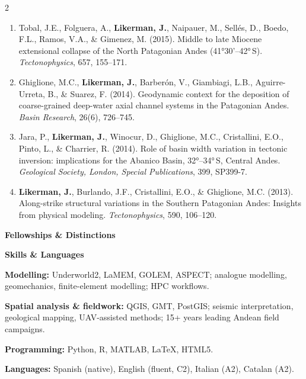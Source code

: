 \documentclass[10pt,a4paper]{../awesome-cv}
\makeatletter
\renewcommand*{\sectionstyle}[1]{{\fontsize{12.5pt}{15pt}\bodyfont\bfseries\color{text}\@sectioncolor #1}}
\renewcommand*{\descriptionstyle}[1]{{\fontsize{8.8pt}{11.2pt}\bodyfontlight\upshape\color{text} #1}}
\renewcommand{\cvsection}[1]{%
  \par\vspace{3mm}%
  \sectionstyle{#1}%
  \phantomsection%
  \color{gray}\vhrulefill{0.9pt}%
  \par\nobreak\vspace{1.8mm}%
}
\makeatother
\begin{document}
{\begin{multicols}{2}
\begin{enumerate}
  \item Tobal, J.E., Folguera, A., \textbf{Likerman, J.}, Naipauer, M., Sellés, D., Boedo, F.L., Ramos, V.A., \& Gimenez, M. (2015). Middle to late Miocene extensional collapse of the North Patagonian Andes (41°30'--42°\,S). \emph{Tectonophysics}, 657, 155--171.
  \item Ghiglione, M.C., \textbf{Likerman, J.}, Barberón, V., Giambiagi, L.B., Aguirre-Urreta, B., \& Suarez, F. (2014). Geodynamic context for the deposition of coarse-grained deep-water axial channel systems in the Patagonian Andes. \emph{Basin Research}, 26(6), 726--745.
  \item Jara, P., \textbf{Likerman, J.}, Winocur, D., Ghiglione, M.C., Cristallini, E.O., Pinto, L., \& Charrier, R. (2014). Role of basin width variation in tectonic inversion: implications for the Abanico Basin, 32°--34°\,S, Central Andes. \emph{Geological Society, London, Special Publications}, 399, SP399-7.
  \item \textbf{Likerman, J.}, Burlando, J.F., Cristallini, E.O., \& Ghiglione, M.C. (2013). Along-strike structural variations in the Southern Patagonian Andes: Insights from physical modeling. \emph{Tectonophysics}, 590, 106--120.
\end{enumerate}
\end{multicols}
}

\cvsection{Fellowships \& Distinctions}
\begin{cvhonors}
\end{cvhonors}

\cvsection{Skills \& Languages}
\descriptionstyle{\textbf{Modelling:} Underworld2, LaMEM, GOLEM, ASPECT; analogue modelling, geomechanics, finite-element modelling; HPC workflows.}\par
\vspace{0.8mm}
\descriptionstyle{\textbf{Spatial analysis \& fieldwork:} QGIS, GMT, PostGIS; seismic interpretation, geological mapping, UAV-assisted methods; 15+ years leading Andean field campaigns.}\par
\vspace{0.8mm}
\descriptionstyle{\textbf{Programming:} Python, R, MATLAB, \LaTeX{}, HTML5.}\par
\vspace{0.8mm}
\descriptionstyle{\textbf{Languages:} Spanish (native), English (fluent, C2), Italian (A2), Catalan (A2).}
\end{document}
